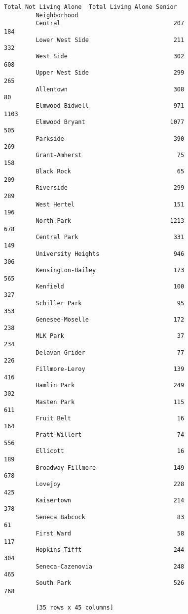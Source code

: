 \documentclass[11pt]{article}
\begin{document}
\begin{Verbatim}[commandchars=\\\{\}]
                             Total Not Living Alone  Total Living Alone Senior  
         Neighborhood                                                           
         Central                                207                        184  
         Lower West Side                        211                        332  
         West Side                              302                        608  
         Upper West Side                        299                        265  
         Allentown                              308                         80  
         Elmwood Bidwell                        971                       1103  
         Elmwood Bryant                        1077                        505  
         Parkside                               390                        269  
         Grant-Amherst                           75                        158  
         Black Rock                              65                        209  
         Riverside                              299                        289  
         West Hertel                            151                        196  
         North Park                            1213                        678  
         Central Park                           331                        149  
         University Heights                     946                        306  
         Kensington-Bailey                      173                        565  
         Kenfield                               100                        327  
         Schiller Park                           95                        353  
         Genesee-Moselle                        172                        238  
         MLK Park                                37                        234  
         Delavan Grider                          77                        226  
         Fillmore-Leroy                         139                        416  
         Hamlin Park                            249                        302  
         Masten Park                            115                        611  
         Fruit Belt                              16                        164  
         Pratt-Willert                           74                        556  
         Ellicott                                16                        189  
         Broadway Fillmore                      149                        678  
         Lovejoy                                228                        425  
         Kaisertown                             214                        378  
         Seneca Babcock                          83                         61  
         First Ward                              58                        117  
         Hopkins-Tifft                          244                        304  
         Seneca-Cazenovia                       248                        465  
         South Park                             526                        768  
         
         [35 rows x 45 columns]
\end{Verbatim}
            
\end{document}
